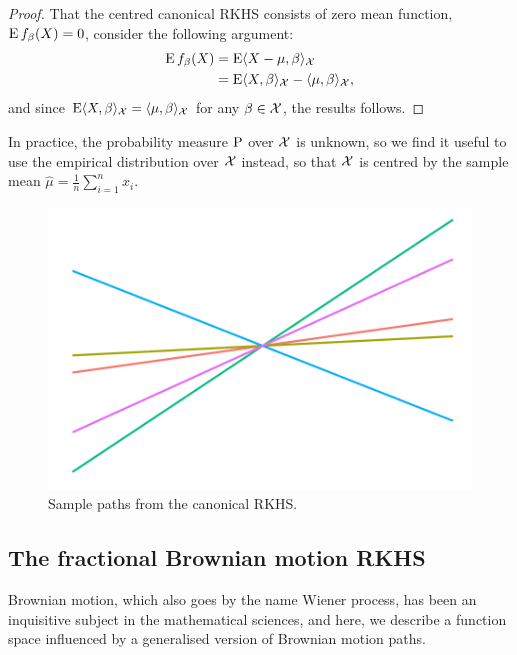 \begin{proof}
  That the centred canonical RKHS consists of zero mean function, $\operatorname{E} f_\beta(X) = 0$, consider the following argument:
  \begin{align*}
    \operatorname{E} f_\beta(X) 
    &= \operatorname{E} \langle X-\mu,\beta\rangle_{\mathcal X} \\
    &= \operatorname{E} \langle X,\beta\rangle_{\mathcal X} - \langle\mu,\beta\rangle_{\mathcal X},
  \end{align*}
  and since $\operatorname{E} \langle X,\beta\rangle_{\mathcal X} = \langle\mu,\beta\rangle_{\mathcal X}$ for any $\beta\in{\mathcal X}$, the results follows.
\end{proof}

\begin{remark}
  In practice, the probability measure $\operatorname{P}$ over ${\mathcal X}$ is unknown, so we find it useful to use the empirical distribution over ${\mathcal X}$ instead, so that ${\mathcal X}$ is centred by the sample mean $\hat\mu = \frac{1}{n}\sum_{i=1}^n x_i$.  
\end{remark}

\begin{figure}[hbt]
  \centering
  \includegraphics[scale=0.3]{figure/kernel_path_canonical_th}
  \caption{Sample paths from the canonical RKHS.}
\end{figure}

\subsection{The fractional Brownian motion RKHS}

Brownian motion, which also goes by the name Wiener process, has been an inquisitive subject in the mathematical sciences, and here, we describe a function space influenced by a generalised version of Brownian motion paths.

